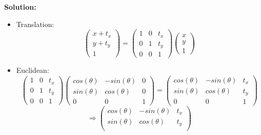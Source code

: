 \documentclass[12pt]{article}
\begin{document}
\begin{enumerate}[leftmargin=\labelsep]
\begin{enumerate}
    \textbf{Solution:}
    \begin{itemize}
        \item Translation:
        \begin{equation}
            \begin{pmatrix}
            x+t_x \\
            y+t_y \\
            1 
            \end{pmatrix}= 
            \begin{pmatrix}
            1 & 0 &  t_x \\
            0 & 1 & t_y \\
            0 & 0 & 1
            \end{pmatrix}
            \begin{pmatrix}
            x \\
            y \\
            1 
            \end{pmatrix}
        \end{equation}
        \item Euclidean:
            \begin{equation}
                \begin{pmatrix}
                1& 0 &  t_x \\
                0 & 1 & t_y \\
                0 & 0 & 1
                \end{pmatrix}
                \begin{pmatrix}
                    cos(\theta) & -sin(\theta) & 0 \\
                    sin(\theta) & cos(\theta) & 0 \\
                    0 & 0 & 1
                \end{pmatrix}= 
                \begin{pmatrix}
                    cos(\theta) & -sin(\theta) &  t_x \\
                    sin(\theta) & cos(\theta) & t_y \\
                    0 & 0 & 1
                \end{pmatrix}
            \end{equation}
            \begin{equation}
            \Rightarrow
            \begin{pmatrix}
                cos(\theta) & -sin(\theta) &  t_x \\
                sin(\theta) & cos(\theta) & t_y \\

\end{pmatrix}
\end{equation}
\end{itemize}
\end{enumerate}
\end{enumerate}
\end{document}
